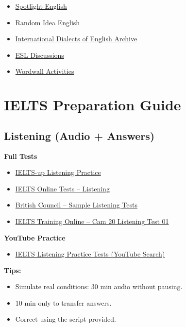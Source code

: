 \begin{itemize}
    \item \href{https://spotlightenglish.com}{Spotlight English}
    \item \href{http://random-idea-english.blogspot.com}{Random Idea English}
    \item \href{https://www.dialectsarchive.com}{International Dialects of English Archive}
    \item \href{https://iesldiscussions.com}{ESL Discussions}
    \item \href{https://wordwall.net}{Wordwall Activities}
\end{itemize}

\section{IELTS Preparation Guide}

\subsection{Listening  (Audio + Answers)}

\textbf{Full Tests}
\begin{itemize}
    \item \href{https://ielts-up.com/listening/ielts-listening-practice.html}{IELTS-up Listening Practice}
    \item \href{https://ieltsonlinetests.com/ielts-listening-tests}{IELTS Online Tests – Listening}
    \item \href{https://takeielts.britishcouncil.org/take-ielts/prepare/free-ielts-english-practice-tests/listening}{British Council – Sample Listening Tests}
    \item \href{https://ieltstrainingonline.com/practice-cam-20-listening-test-01-with-answer-and-audioscripts/}{IELTS Training Online – Cam 20 Listening Test 01}
\end{itemize}

\textbf{YouTube Practice}
\begin{itemize}
    \item \href{https://www.youtube.com/results?search_query=ielts+listening+practice+test+with+answers}{IELTS Listening Practice Tests (YouTube Search)}
\end{itemize}

\noindent\textbf{Tips:}
\begin{itemize}
    \item Simulate real conditions: 30 min audio without pausing.
    \item 10 min only to transfer answers.
    \item Correct using the script provided.
\end{itemize}

